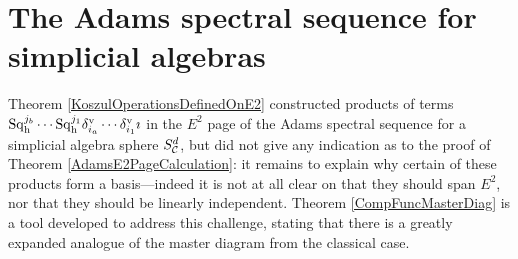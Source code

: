 \documentclass[11pt]{article}
\theoremstyle{plain}
\newcommand{\Sq}{\mathrm{Sq}}
\begin{document}
\section{The Adams spectral sequence for simplicial algebras}
Theorem \ref{KoszulOperationsDefinedOnE2} constructed products of terms $\Sq^{j_b}_\textup{h}\cdots \Sq^{j_1}_\textup{h}\delta_{i_a}^\textup{v}\cdots \delta_{i_1}^\textup{v}\imath$ in the $E^2$ page of the Adams spectral sequence for a simplicial algebra sphere $S^d_{\mathcal{C}}$, but did not give any indication as to the proof of Theorem \ref{AdamsE2PageCalculation}: it remains to explain why certain of these products form a basis---indeed it is not at all clear on that they should span $E^2$, nor that they should be linearly independent. Theorem \ref{CompFuncMasterDiag} is a tool developed to address this challenge, stating that there is a greatly expanded analogue of the master diagram from the classical case. 
%
%
%
%
%
\end{document}
